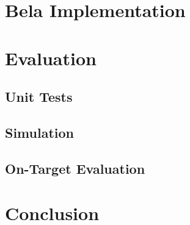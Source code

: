 \documentclass{article}
\begin{document}

\section{Bela Implementation}

\section{Evaluation}

\subsection{Unit Tests}

\subsection{Simulation}

\subsection{On-Target Evaluation}

\section{Conclusion}
\end{document}
